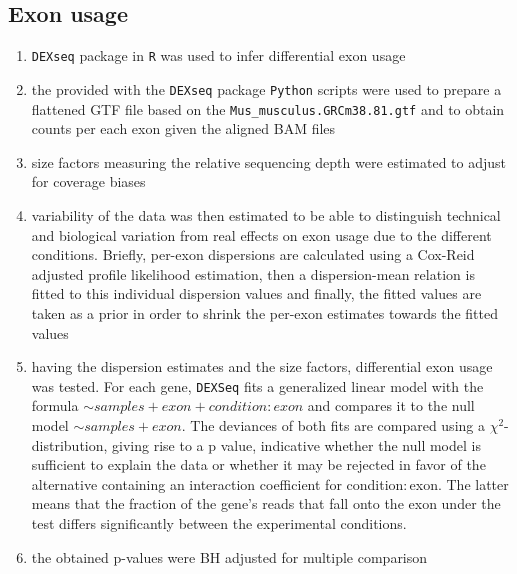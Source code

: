 \documentclass[12pt]{article}
\newcommand{\refAnnotation}{\texttt{Mus\_musculus.GRCm38.81.gtf}}
\begin{document}
\subsection{Exon usage}
\begin{enumerate}
  \item \texttt{DEXseq} package in \texttt{R} was used to infer differential exon usage
  \item the provided with the \texttt{DEXseq} package \texttt{Python} scripts were used to prepare a flattened GTF file based on the {\refAnnotation} and to obtain counts per each exon given the aligned BAM files
  \item size factors measuring the relative sequencing depth were estimated to adjust for coverage biases
  \item variability of the data was then estimated to be able to distinguish technical and biological variation from real effects on exon usage due to the different conditions. Briefly, per-exon dispersions are calculated using a Cox-Reid adjusted profile likelihood estimation, then a dispersion-mean relation is fitted to this individual dispersion values and finally, the fitted values are taken as a prior in order to shrink the per-exon estimates towards the fitted values
  \item having the dispersion estimates and the size factors, differential exon usage was tested. For each gene, \texttt{DEXSeq} fits a generalized linear model with the formula \( \sim samples + exon + condition:exon\) and compares it to the null model  \( \sim samples + exon\). The deviances of both fits are compared using a $\chi^2$-distribution, giving rise to a p value, indicative whether the null model is sufficient to explain the data or whether it may be rejected in favor of the alternative containing an interaction coefficient for condition$\colon$exon. The latter means that the fraction of the gene's reads that fall onto the exon under the test differs significantly between the experimental conditions.
  \item the obtained p-values were BH adjusted for multiple comparison
\end{enumerate}
\end{document}
